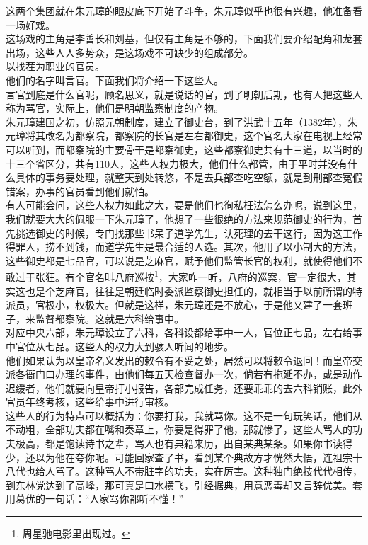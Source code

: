 \begin{multicols}{\theparacolNo}
这两个集团就在朱元璋的眼皮底下开始了斗争，朱元璋似乎也很有兴趣，他准备看一场好戏。\\

这场戏的主角是李善长和刘基，但仅有主角是不够的，下面我们要介绍配角和龙套出场，这些人人多势众，是这场戏不可缺少的组成部分。\\

以找茬为职业的官员。\\

他们的名字叫言官。下面我们将介绍一下这些人。\\

言官到底是什么官呢，顾名思义，就是说话的官，到了明朝后期，也有人把这些人称为骂官，实际上，他们是明朝监察制度的产物。\\

朱元璋建国之初，仿照元朝制度，建立了御史台，到了洪武十五年（1382年），朱元璋将其改名为都察院，都察院的长官是左右都御史，这个官名大家在电视上经常可以听到，而都察院的主要骨干是都察御史，这些都察御史共有十三道，以当时的十三个省区分，共有110人，这些人权力极大，他们什么都管，由于平时并没有什么具体的事务要处理，就整天到处转悠，不是去兵部查吃空额，就是到刑部查冤假错案，办事的官员看到他们就怕。\\

有人可能会问，这些人权力如此之大，要是他们也徇私枉法怎么办呢，说到这里，我们就要大大的佩服一下朱元璋了，他想了一些很绝的方法来规范御史的行为，首先挑选御史的时候，专门找那些书呆子道学先生，认死理的去干这行，因为这工作得罪人，捞不到钱，而道学先生是最合适的人选。其次，他用了以小制大的方法，这些御史都是七品官，可以说是芝麻官，赋予他们监管长官的权利，就使得他们不敢过于张狂。有个官名叫八府巡按\footnote{周星驰电影里出现过。}，大家咋一听，八府的巡案，官一定很大，其实这也是个芝麻官，往往是朝廷临时委派监察御史担任的，就相当于以前所谓的特派员，官极小，权极大。但就是这样，朱元璋还是不放心，于是他又建了一套班子，来监督都察院。这就是六科给事中。\\

对应中央六部，朱元璋设立了六科，各科设都给事中一人，官位正七品，左右给事中官位从七品。这些人的权力大到骇人听闻的地步。\\

他们如果认为以皇帝名义发出的敕令有不妥之处，居然可以将敕令退回！而皇帝交派各衙门口办理的事件，由他们每五天检查督办一次，倘若有拖延不办，或是动作迟缓者，他们就要向皇帝打小报告，各部完成任务，还要乖乖的去六科销账，此外官员年终考核，这些给事中进行审核。\\

这些人的行为特点可以概括为：你要打我，我就骂你。这不是一句玩笑话，他们从不动粗，全部功夫都在嘴和奏章上，你要是得罪了他，那就惨了，这些人骂人的功夫极高，都是饱读诗书之辈，骂人也有典籍来历，出自某典某条。如果你书读得少，还以为他在夸你呢。可能回家查了书，看到某个典故方才恍然大悟，连祖宗十八代也给人骂了。这种骂人不带脏字的功夫，实在厉害。这种独门绝技代代相传，到东林党达到了高峰，那可真是口水横飞，引经据典，用意恶毒却又言辞优美。套用葛优的一句话：“人家骂你都听不懂！”\\


\end{multicols}
